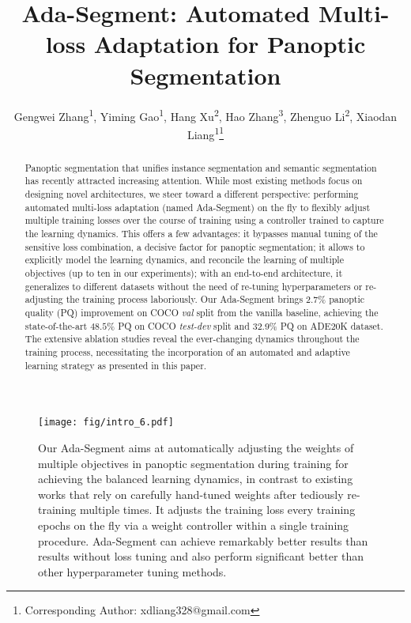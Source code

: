 \documentclass[letterpaper]{article} \usepackage{aaai21}  \usepackage{times}  \usepackage{helvet} \usepackage{courier}  \usepackage[hyphens]{url}  \usepackage{graphicx} \urlstyle{rm} \def\UrlFont{\rm}  \usepackage{natbib}  \usepackage{caption} \frenchspacing  \setlength{\pdfpagewidth}{8.5in}  \setlength{\pdfpageheight}{11in}
\title{Ada-Segment: Automated Multi-loss Adaptation for Panoptic Segmentation}
\author{Gengwei Zhang\textsuperscript{\rm 1}, 
Yiming Gao\textsuperscript{\rm 1}, 
Hang Xu\textsuperscript{\rm 2}, 
Hao Zhang\textsuperscript{\rm 3}, 
Zhenguo Li\textsuperscript{\rm 2}, 
Xiaodan Liang\textsuperscript{\rm 1}\thanks{Corresponding Author: xdliang328@gmail.com} \\ 
}
\begin{document}
\maketitle


\begin{abstract}
    Panoptic segmentation that unifies instance segmentation 
    and semantic segmentation has recently attracted increasing attention. 
While most existing methods focus on 
designing novel architectures,
    we steer toward a different perspective: 
    performing automated multi-loss adaptation (named Ada-Segment) on the fly to flexibly adjust multiple 
    training losses over the course of training using a controller trained to capture the learning dynamics. 
    This offers a few advantages: 
    it bypasses manual tuning of the sensitive loss combination,
a decisive factor for panoptic segmentation; 
    it allows to explicitly model the learning dynamics, 
    and reconcile the learning of multiple objectives (up to ten in our experiments);
with an end-to-end architecture, 
    it generalizes to different datasets without the need of re-tuning hyperparameters or 
    re-adjusting the training process laboriously. 
    Our Ada-Segment brings 2.7\% panoptic quality (PQ) improvement on COCO \textit{val} split 
    from the vanilla baseline, 
    achieving the state-of-the-art $48.5\%$ PQ on COCO \textit{test-dev} split 
    and 32.9\% PQ on ADE20K dataset.
The extensive ablation studies reveal the ever-changing dynamics 
    throughout the training process, 
    necessitating the incorporation of an automated and adaptive learning strategy as presented 
    in this paper. 
\end{abstract}

\begin{figure}[t]
    \centering
\texttt{[image: fig/intro\_6.pdf]}
\caption{Our Ada-Segment aims at automatically adjusting the weights of multiple objectives 
    in panoptic segmentation during training for achieving the balanced learning dynamics, 
    in contrast to existing works that rely on carefully hand-tuned weights after tediously re-training 
    multiple times. 
    It adjusts the training loss every training epochs on the fly via a weight controller 
    within a single training procedure. 
    Ada-Segment can achieve remarkably better results than results without loss tuning 
    and also perform significant better than other hyperparameter tuning methods. }
\label{intro2}
\end{figure}
\end{document}
